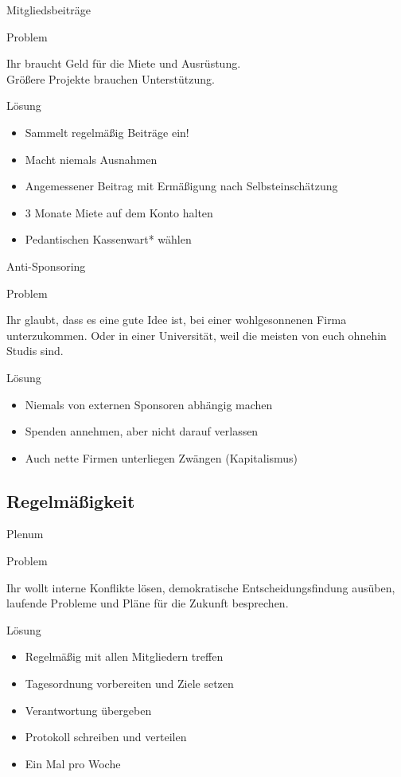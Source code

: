 \documentclass[aspectratio=43]{beamer}
\newcommand{\pattern}[2]{
  \begin{alertblock}{Problem}
    #1
  \end{alertblock}
  \pause
  \begin{exampleblock}{Lösung}
    #2
  \end{exampleblock}
}
\begin{document}
  \begin{frame}{Mitgliedsbeiträge}
    \pattern{
      Ihr braucht Geld für die Miete und Ausrüstung.\\
      Größere Projekte brauchen Unterstützung.
    }{
      \begin{itemize}
        \item{Sammelt regelmäßig Beiträge ein!}
        \pause
        \item{Macht niemals Ausnahmen}
        \pause
        \item{Angemessener Beitrag mit Ermäßigung nach Selbsteinschätzung}
        \pause
        \item{3 Monate Miete auf dem Konto halten}
        \pause
        \item{Pedantischen Kassenwart* wählen}
      \end{itemize}
    }
  \end{frame}

  \begin{frame}{Anti-Sponsoring}
    \pattern{
      Ihr glaubt, dass es eine gute Idee ist, bei einer wohlgesonnenen Firma
      unterzukommen. Oder in einer Universität, weil die meisten von euch
      ohnehin Studis sind.
    }{
      \begin{itemize}
        \item{Niemals von externen Sponsoren abhängig machen}
        \pause
        \item{Spenden annehmen, aber nicht darauf verlassen}
        \pause
        \item{Auch nette Firmen unterliegen Zwängen (Kapitalismus)}
      \end{itemize}
    }
  \end{frame}

  \subsection{Regelmäßigkeit}

  \begin{frame}{Plenum}
    \pattern{
      Ihr wollt interne Konflikte lösen, demokratische Entscheidungsfindung
      ausüben, laufende Probleme und Pläne für die Zukunft besprechen.
    }{
      \begin{itemize}
        \item{Regelmäßig mit allen Mitgliedern treffen}
        \pause
        \item{Tagesordnung vorbereiten und Ziele setzen}
        \pause
        \item{Verantwortung übergeben}
        \pause
        \item{Protokoll schreiben und verteilen}
        \pause
        \item{Ein Mal pro Woche}
      \end{itemize}
    }
  \end{frame}
\end{document}
